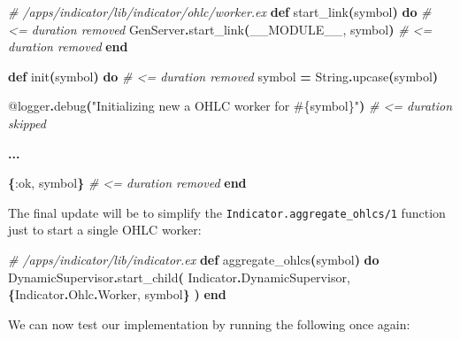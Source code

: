 \documentclass[
  oneside]{book}
\newenvironment{Shaded}{\begin{snugshade}}{\end{snugshade}}
\newcommand{\CommentTok}[1]{\textcolor[rgb]{0.56,0.35,0.01}{\textit{#1}}}
\newcommand{\ConstantTok}[1]{\textcolor[rgb]{0.56,0.35,0.01}{#1}}
\newcommand{\FunctionTok}[1]{\textcolor[rgb]{0.13,0.29,0.53}{\textbf{#1}}}
\newcommand{\KeywordTok}[1]{\textcolor[rgb]{0.13,0.29,0.53}{\textbf{#1}}}
\newcommand{\NormalTok}[1]{#1}
\newcommand{\OperatorTok}[1]{\textcolor[rgb]{0.81,0.36,0.00}{\textbf{#1}}}
\newcommand{\OtherTok}[1]{\textcolor[rgb]{0.56,0.35,0.01}{#1}}
\newcommand{\StringTok}[1]{\textcolor[rgb]{0.31,0.60,0.02}{#1}}
\newcommand{\VariableTok}[1]{\textcolor[rgb]{0.00,0.00,0.00}{#1}}
\begin{document}
\begin{Shaded}
\begin{Highlighting}[]
\CommentTok{\# /apps/indicator/lib/indicator/ohlc/worker.ex}
  \KeywordTok{def}\NormalTok{ start\_link}\FunctionTok{(}\NormalTok{symbol}\FunctionTok{)} \KeywordTok{do} \CommentTok{\# \textless{}= duration removed}
    \ConstantTok{GenServer}\OperatorTok{.}\NormalTok{start\_link}\FunctionTok{(}\ConstantTok{\_\_MODULE\_\_}\NormalTok{, symbol}\FunctionTok{)}  \CommentTok{\# \textless{}= duration removed}
  \KeywordTok{end}

  \KeywordTok{def}\NormalTok{ init}\FunctionTok{(}\NormalTok{symbol}\FunctionTok{)} \KeywordTok{do}  \CommentTok{\# \textless{}= duration removed}
\NormalTok{    symbol }\OperatorTok{=} \ConstantTok{String}\OperatorTok{.}\NormalTok{upcase}\FunctionTok{(}\NormalTok{symbol}\FunctionTok{)}

    \OtherTok{@logger}\OperatorTok{.}\NormalTok{debug}\FunctionTok{(}\StringTok{"Initializing new a OHLC worker for }\OtherTok{\#\{}\NormalTok{symbol}\OtherTok{\}}\StringTok{"}\FunctionTok{)} \CommentTok{\# \textless{}= duration skipped}

    \OperatorTok{...}

    \FunctionTok{\{}\VariableTok{:ok}\NormalTok{, symbol}\FunctionTok{\}}  \CommentTok{\# \textless{}= duration removed}
  \KeywordTok{end}
\end{Highlighting}
\end{Shaded}

The final update will be to simplify the \texttt{Indicator.aggregate\_ohlcs/1} function just to start a single OHLC worker:

\begin{Shaded}
\begin{Highlighting}[]
\CommentTok{\# /apps/indicator/lib/indicator.ex}
  \KeywordTok{def}\NormalTok{ aggregate\_ohlcs}\FunctionTok{(}\NormalTok{symbol}\FunctionTok{)} \KeywordTok{do}
    \ConstantTok{DynamicSupervisor}\OperatorTok{.}\NormalTok{start\_child}\FunctionTok{(}
      \ConstantTok{Indicator}\OperatorTok{.}\ConstantTok{DynamicSupervisor}\NormalTok{,}
      \FunctionTok{\{}\ConstantTok{Indicator}\OperatorTok{.}\ConstantTok{Ohlc}\OperatorTok{.}\ConstantTok{Worker}\NormalTok{, symbol}\FunctionTok{\}}
    \FunctionTok{)}
  \KeywordTok{end}
\end{Highlighting}
\end{Shaded}

We can now test our implementation by running the following once again:
\end{document}
